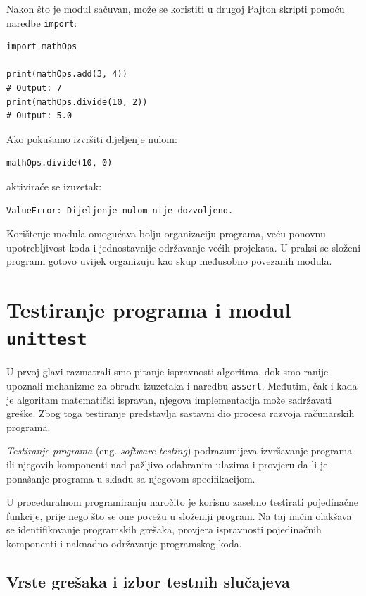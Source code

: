 Nakon što je modul sačuvan, može se koristiti u drugoj Pajton skripti pomoću naredbe \texttt{import}:

\begin{verbatim}
import mathOps

print(mathOps.add(3, 4))
# Output: 7
print(mathOps.divide(10, 2))
# Output: 5.0
\end{verbatim}

Ako pokušamo izvršiti dijeljenje nulom:

\begin{verbatim}
mathOps.divide(10, 0)
\end{verbatim}

aktiviraće se izuzetak:

\begin{verbatim}
ValueError: Dijeljenje nulom nije dozvoljeno.
\end{verbatim}

Korištenje modula omogućava bolju organizaciju programa, veću ponovnu upotrebljivost koda i jednostavnije održavanje većih projekata. U praksi se složeni programi gotovo uvijek organizuju kao skup međusobno povezanih modula.




\section{Testiranje programa i modul \texttt{unittest}}

U prvoj glavi razmatrali smo pitanje ispravnosti algoritma, 
dok smo ranije upoznali mehanizme za obradu 
izuzetaka i naredbu \texttt{assert}. Međutim, čak i kada je 
algoritam matematički ispravan, njegova implementacija može 
sadržavati greške. Zbog toga testiranje predstavlja sastavni 
dio procesa razvoja računarskih programa.

\textit{Testiranje programa} (eng. \emph{software testing}) 
podrazumijeva izvršavanje programa ili njegovih komponenti 
nad pažljivo odabranim ulazima i provjeru da li je ponašanje 
programa u skladu sa njegovom specifikacijom.

U proceduralnom programiranju naročito je korisno zasebno 
testirati pojedinačne funkcije, prije nego što se one povežu 
u složeniji program. Na taj način olakšava se identifikovanje 
programskih grešaka, provjera ispravnosti pojedinačnih 
komponenti i naknadno održavanje programskog koda.


\subsection{Vrste grešaka i izbor testnih slučajeva}

